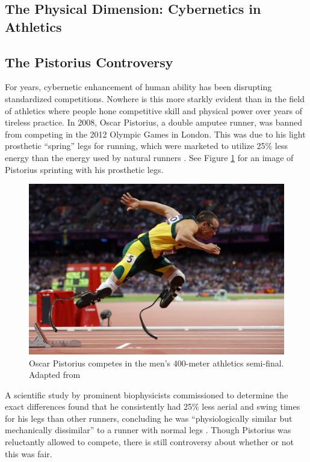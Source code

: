 \documentclass[10pt, oneside, letterpaper]{article}
\begin{document}
\begin{multicols}{2}
	\section{The Physical Dimension: Cybernetics in Athletics}

	\subsection{The Pistorius Controversy}

	For years, cybernetic enhancement of human ability has been disrupting standardized competitions. Nowhere is this more starkly evident than in the field of athletics where people hone competitive skill and physical power over years of tireless practice. In 2008, Oscar Pistorius, a double amputee runner, was banned from competing in the 2012 Olympic Games in London. This was due to his light prosthetic ``spring'' legs for running, which were marketed to utilize 25\% less energy than the energy used by natural runners \cite{Evelith2012}. See Figure \ref{fig:pistorius} for an image of Pistorius sprinting with his prosthetic legs.

	\begin{figure}[H]
		\centering
		\includegraphics[width=\linewidth]{pistorius}
		\caption{Oscar Pistorius competes in the men's 400-meter athletics semi-final. Adapted from \protect\cite{Niedringhaus2012}}
		\label{fig:pistorius}
	\end{figure}

	A scientific study by prominent biophysicists commissioned to determine the exact differences found that he consistently had 25\% less aerial and swing times for his legs than other runners, concluding he was ``physiologically similar but mechanically dissimilar'' to a runner with normal legs \cite{Weyand2009}. Though Pistorius was reluctantly allowed to compete, there is still controversy about whether or not this was fair.


\end{multicols}
\end{document}
